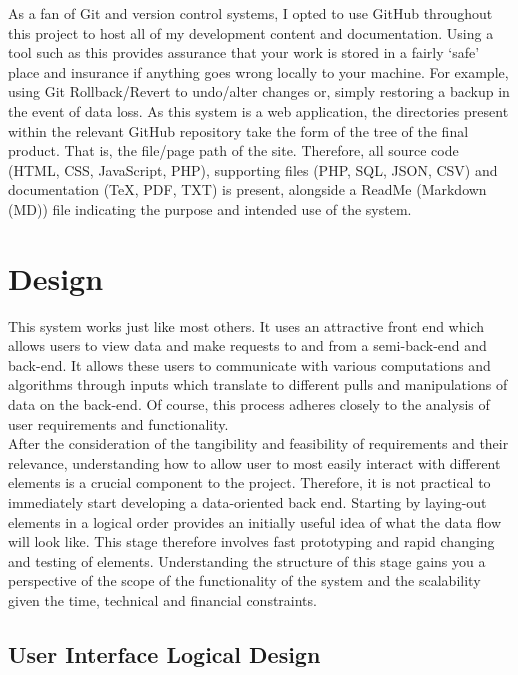 \documentclass[11pt, english]{article}
\begin{document}
	As a fan of Git and version control systems, I opted to use GitHub throughout this project to host all of my development content and documentation. Using a tool such as this provides assurance that your work is stored in a fairly `safe' place and insurance if anything goes wrong locally to your machine. For example, using Git Rollback/Revert to undo/alter changes or, simply restoring a backup in the event of data loss. As this system is a web application, the directories present within the relevant GitHub repository take the form of the tree of the final product. That is, the file/page path of the site. Therefore, all source code (HTML, CSS, JavaScript, PHP), supporting files (PHP, SQL, JSON, CSV) and documentation (TeX, PDF, TXT) is present, alongside a ReadMe (Markdown (MD)) file indicating the purpose and intended use of the system.

\newpage

\section{Design}

	This system works just like most others. It uses an attractive front end which allows users to view data and make requests to and from a semi-back-end and back-end. It allows these users to communicate with various computations and algorithms through inputs which translate to different pulls and manipulations of data on the back-end. Of course, this process adheres closely to the analysis of user requirements and functionality.\\

	After the consideration of the tangibility and feasibility of requirements and their relevance, understanding how to allow user to most easily interact with different elements is a crucial component to the project. Therefore, it is not practical to immediately start developing a data-oriented back end. Starting by laying-out elements in a logical order provides an initially useful idea of what the data flow will look like. This stage therefore involves fast prototyping and rapid changing and testing of elements. Understanding the structure of this stage gains you a perspective of the scope of the functionality of the system and the scalability given the time, technical and financial constraints.

	\subsection{User Interface Logical Design}
\end{document}
